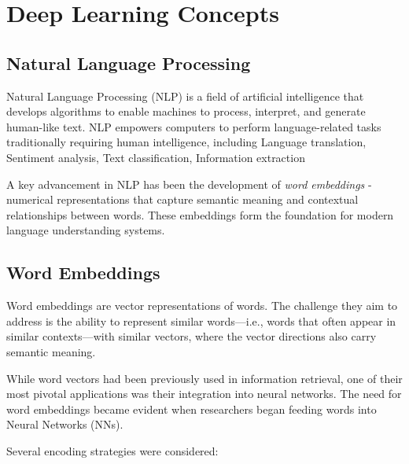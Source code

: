 \section{Deep Learning Concepts}
\label{sec:deep-concepts}

\subsection*{Natural Language Processing}
\label{sssec:nlp}

Natural Language Processing (NLP) is a field of artificial intelligence that develops algorithms to enable machines to process, interpret, and generate human-like text. NLP empowers computers to perform language-related tasks traditionally requiring human intelligence, including Language translation, Sentiment analysis, Text classification, Information extraction


A key advancement in NLP has been the development of \textit{word embeddings} - numerical representations that capture semantic meaning and contextual relationships between words. These embeddings form the foundation for modern language understanding systems.



\subsection*{Word Embeddings}
\label{sssec:word-embeddings}

Word embeddings are vector representations of words. The challenge they aim to address is the ability to represent similar words—i.e., words that often appear in similar contexts—with similar vectors, where the vector directions also carry semantic meaning. 

While word vectors had been previously used in information retrieval, one of their most pivotal applications was their integration into neural networks. The need for word embeddings became evident when researchers began feeding words into Neural Networks (NNs).

Several encoding strategies were considered:

